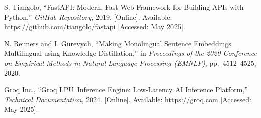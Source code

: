 \begin{flushleft}
\noindent[23]\hspace{6pt}
S. Tiangolo,
``FastAPI: Modern, Fast Web Framework for Building APIs with Python,''
\textit{GitHub Repository}, 2019. [Online]. Available:
\url{https://github.com/tiangolo/fastapi}
[Accessed: May 2025].

\noindent[24]\hspace{6pt}
N. Reimers and I. Gurevych,
``Making Monolingual Sentence Embeddings Multilingual using Knowledge
Distillation,''
in \textit{Proceedings of the 2020 Conference on Empirical Methods in Natural
Language Processing (EMNLP)}, pp.~4512--4525, 2020.

\noindent[25]\hspace{6pt}
Groq Inc.,
``Groq LPU\texttrademark\ Inference Engine: Low-Latency AI Inference Platform,''
\textit{Technical Documentation}, 2024. [Online]. Available:
\url{https://groq.com}
[Accessed: May 2025].

\end{flushleft}